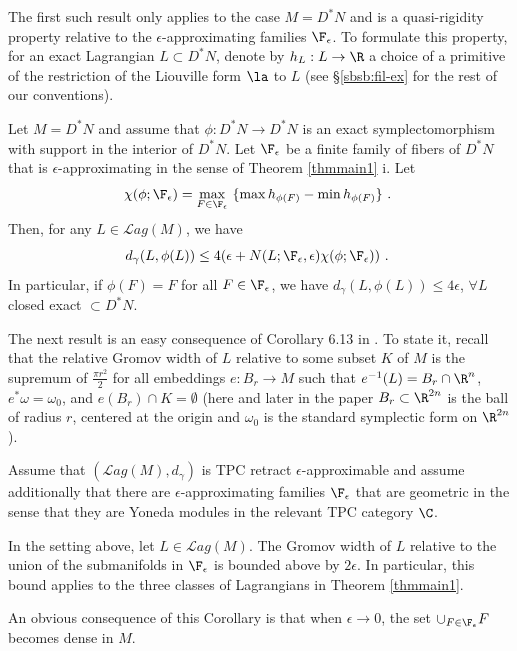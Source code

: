 The first such result only applies to the case $M=D^{\ast}N$ and is a quasi-rigidity property relative to the $\epsilon$-approximating families $\F_{\epsilon}$.  To formulate this property,  for an exact Lagrangian  $L\subset  D^{\ast}N$, denote by $h_{L}:L\to \R$ a choice of a primitive of the restriction of the Liouville form $\la$ to $L$ (see \S\ref{sbsb:fil-ex} for the rest of our  conventions). 

\begin{cor}\label{cor:quasi-rig} Let $M=D^{\ast}N$ and assume that  $\phi :D^{\ast}N\to D^{\ast}N$ is an exact symplectomorphism with support in the
interior of $D^{\ast}N$. Let $\F_{\epsilon}$ be a finite family of fibers of $D^{\ast}N$ that is $\epsilon$-approximating in the sense of Theorem \ref{thmmain1} i. Let
$$\chi (\phi; \F_{\epsilon}) =\max_{F\in\F_{\epsilon}}\ \{ \max h_{\phi(F)} - \min h_{\phi(F)}\}~.~$$
Then, for any $L\in \mathcal{L}ag(M)$, we have $$d_{\gamma}(L,\phi(L)) \leq 4(\epsilon + N(L;\F_{\epsilon}, \epsilon) \chi(\phi;\F_{\epsilon}))~.~$$
In particular, if $\phi(F)=F$ for all $F\in \F_{\epsilon}$, we have $d_{\gamma}(L,\phi(L)) \leq 4\epsilon$, $\forall L$ closed exact $\subset D^{\ast}N$.
\end{cor}

 The next result is an easy consequence of Corollary 6.13  in \cite{Bi-Co-Sh:LagrSh}.
To state it,  recall \cite{Bar-Cor:Serre} \cite{Bi-Co:rigidity} that the relative Gromov width of $L$ relative to some subset $K$ of $M$ is the supremum
of $\frac{\pi r^{2}}{2}$ for all embeddings $e: B_{r}\to M$ such that $e^{-1}(L)=B_{r}\cap \R^{n}$, $e^{\ast}\omega=\omega_{0}$,  and $e(B_{r})\cap K=\emptyset$ (here and later in the paper $B_{r}\subset \R^{2n}$ is the ball of radius $r$, centered at the origin and $\omega_{0}$ is the standard symplectic form on $\R^{2n}$).

Assume that $(\mathcal{L}ag (M), d_{\gamma})$ is TPC retract $\epsilon$-approximable  and assume additionally that there  are $\epsilon$-approximating families $\F_{\epsilon}$ that are geometric in the sense that they are Yoneda modules in the relevant TPC category $\C$. 

\begin{cor}\label{cor:link} In the setting above, let $L\in\mathcal{L}ag(M)$. The  Gromov width of $L$ relative to the union of the submanifolds in $\F_{\epsilon}$ is bounded above by $2\epsilon$. In particular, this bound applies to the three classes of Lagrangians in Theorem \ref{thmmain1}. 
\end{cor}
An obvious consequence of this Corollary is that when $\epsilon \to 0$, the set $\cup_{F\in\F_{\epsilon}} F$
becomes dense in $M$.



